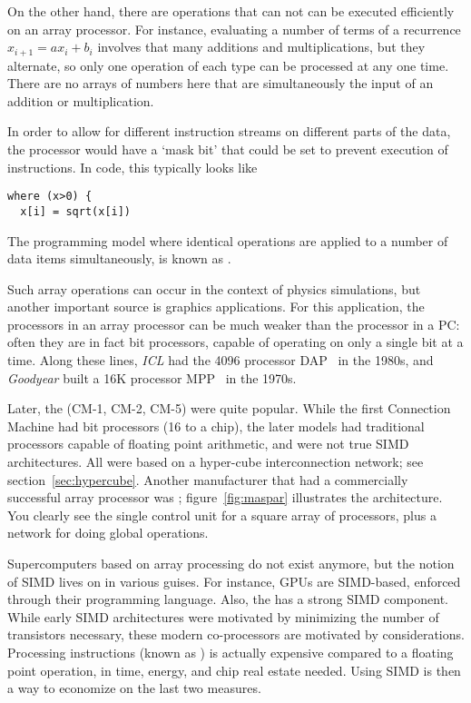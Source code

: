 On the other hand, there are operations that can not can be executed
efficiently on an array processor. For instance, evaluating a number
of terms of a recurrence $x_{i+1}=ax_i+b_i$ involves that many
additions and multiplications, but they alternate, so only one
operation of each type can be processed at any one time. There are no
arrays of numbers here that are simultaneously the input of an
addition or multiplication.

In order to allow for different instruction streams on
different parts of the data, the processor would have a `mask bit'
that could be set to prevent execution of instructions. In code, this 
typically looks like
\begin{verbatim}
where (x>0) {
  x[i] = sqrt(x[i])
\end{verbatim}
The programming model where identical operations are applied to a
number of data items simultaneously, is known as
.

Such array operations can occur in the context of physics simulations,
but another important source is graphics applications. For this
application, the processors in an array processor can be much weaker
than the processor in a PC: often they are in fact bit processors,
capable of operating on only a single bit at a time. Along these
lines, \emph{ICL} had the 4096 processor
DAP~\cite{DAP:79a} in the 1980s, and
\emph{Goodyear} built a 16K processor
MPP~\cite{Batcher:85a} in the 1970s.

Later, the  (CM-1, CM-2, CM-5) were quite popular.
While the first Connection Machine had bit processors (16 to a chip),
the later models had traditional processors capable of floating point
arithmetic, and were not true SIMD architectures. All were based on a
hyper-cube interconnection network; see section~\ref{sec:hypercube}. Another
manufacturer that had a commercially successful array processor was
; figure~\ref{fig:maspar} illustrates the architecture.
You clearly see the single control unit for a square array of processors,
plus a network for doing global operations.

Supercomputers based on array processing do not exist anymore, but the
notion of SIMD lives on in various guises. For instance, \acp{GPU}
are SIMD-based, enforced through their 
programming language. Also, the  has a
strong SIMD component. While early SIMD architectures were motivated
by minimizing the number of transistors necessary, these modern
co-processors are motivated by 
considerations. Processing instructions (known as
) is actually expensive compared to a
floating point operation, in time, energy, and chip real estate needed.
Using SIMD is then a way to economize on the last two measures.

